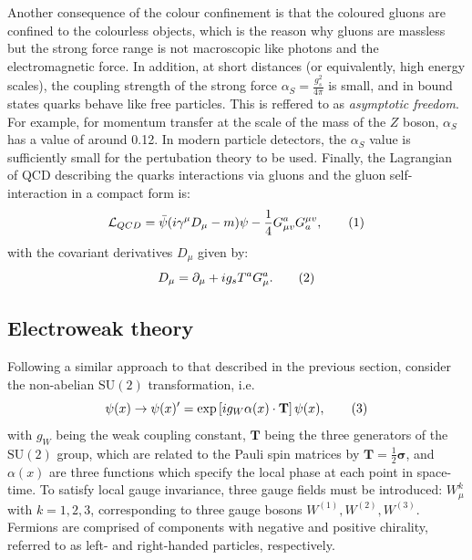 Another consequence of the  colour confinement is that the coloured gluons
are confined to the colourless objects, which is the reason why gluons are massless
but the strong force range is not macroscopic like photons and the electromagnetic force.
In addition, at short distances (or equivalently, high energy scales), the coupling strength 
of the strong force $\alpha_S = \frac{g_s^2}{4\pi}$ is small, 
and in bound states quarks behave like free particles. 
This is reffered to as \textit{asymptotic freedom}. For example, for momentum transfer at 
the scale of the mass of the $Z$ boson, $\alpha_S$ has a value of around 0.12.
In modern particle detectors, the $\alpha_S$ value is sufficiently small for the pertubation
theory to be used.  Finally, the Lagrangian of QCD describing the quarks interactions via gluons and
the gluon self-interaction in a compact form is:
\[
    \mathcal{L}_{QCD}  =  \bar{\psi} (i\gamma^\mu D_\mu - m ) \psi - \frac{1}{4}G^a_{\mu v} G^{\mu v}_a, \addtag \]
with the covariant derivatives $D_\mu$ given by:
\[
    D_\mu = \partial_\mu + ig_sT^aG^a_\mu.
    \addtag \]
    

\subsection{Electroweak theory}
Following a similar approach to that described in the previous section, 
consider the non-abelian $\text{SU}(2)$ transformation, i.e.\ 
\[
    \psi(x) \rightarrow \psi(x) ' = \text{exp}\left[  ig_W \alpha(x)\cdot \textbf{T} \right] \psi(x),\addtag \]
with $g_W$ being the weak coupling constant, $\textbf{T}$ being the three generators of the $\text{SU}(2)$ group, 
which are related to the Pauli spin matrices by $\textbf{T} =  \frac{1}{2}\mathbf{\sigma} $, and $\alpha(x)$ are three functions 
which specify the local phase at each point in space-time. 
To satisfy local gauge invariance, three gauge fields must be introduced: $W^k_\mu$ with $k = 1,2,3$, 
corresponding to three gauge bosons $W^{(1)}, W^{(2)}, W^{(3)}$.
Fermions are comprised of components with negative and positive chirality,
referred to as left- and right-handed particles, respectively.

